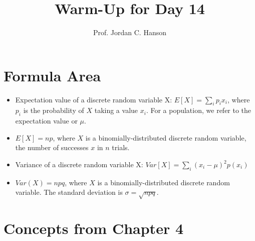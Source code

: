 \documentclass{article}
\begin{document}
\title{Warm-Up for Day 14}
\author{Prof. Jordan C. Hanson}

\maketitle

\section{Formula Area}

\begin{itemize}
\item Expectation value of a discrete random variable X: $E[X] = \sum_i p_i x_i$, where $p_i$ is the probability of $X$ taking a value $x_i$.  For a population, we refer to the expectation value or $\mu$.
\item $E[X] = n p$, where $X$ is a binomially-distributed discrete random variable, the number of successes $x$ in $n$ trials.
\item Variance of a discrete random variable X: $Var[X] = \sum_i (x_i - \mu)^2 p(x_i)$
\item $Var(X) = n p q$, where $X$ is a binomially-distributed discrete random variable.  The standard deviation is $\sigma = \sqrt{npq}$.
\end{itemize}

\section{Concepts from Chapter 4}
\end{document}
